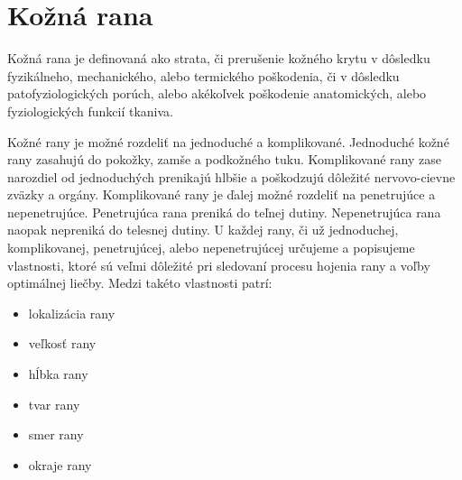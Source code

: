 \section{Kožná rana}
Kožná rana je definovaná ako strata, či prerušenie kožného krytu v dôsledku fyzikálneho, mechanického, alebo termického poškodenia, či v dôsledku patofyziologických porúch, alebo akékoľvek poškodenie anatomických, alebo fyziologických funkcií tkaniva.

Kožné rany je možné rozdeliť na jednoduché a komplikované. Jednoduché kožné rany zasahujú do pokožky, zamše a podkožného tuku. Komplikované rany zase narozdiel od jednoduchých prenikajú hlbšie a poškodzujú dôležité nervovo-cievne zväzky a orgány. Komplikované rany je ďalej možné rozdeliť na penetrujúce a nepenetrujúce. Penetrujúca rana preniká do teľnej dutiny. Nepenetrujúca rana naopak nepreniká do telesnej dutiny. U každej rany, či už jednoduchej, komplikovanej, penetrujúcej, alebo nepenetrujúcej určujeme a popisujeme vlastnosti, ktoré sú veľmi dôležité pri sledovaní procesu hojenia rany a voľby optimálnej liečby. Medzi takéto vlastnosti patrí:
\begin{itemize} 
\item lokalizácia rany
\item veľkosť rany
\item hĺbka rany
\item tvar rany
\item smer rany
\item okraje rany
\end{itemize}

